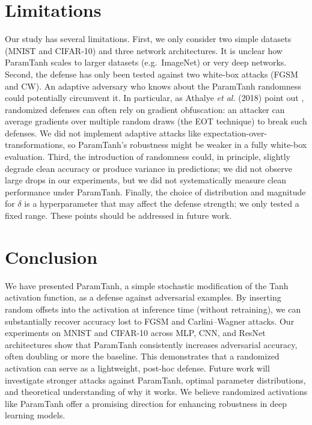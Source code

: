 \documentclass{llncs}
\begin{document}
{\section{Limitations}
Our study has several limitations. First, we only consider two simple datasets (MNIST and CIFAR-10) and three network architectures. It is unclear how ParamTanh scales to larger datasets (e.g.\ ImageNet) or very deep networks. Second, the defense has only been tested against two white-box attacks (FGSM and CW). An adaptive adversary who knows about the ParamTanh randomness could potentially circumvent it. In particular, as Athalye \emph{et al.} (2018) point out \cite{Athalye2018}, randomized defenses can often rely on gradient obfuscation: an attacker can average gradients over multiple random draws (the EOT technique) to break such defenses. We did not implement adaptive attacks like expectation-over-transformations, so ParamTanh’s robustness might be weaker in a fully white-box evaluation. Third, the introduction of randomness could, in principle, slightly degrade clean accuracy or produce variance in predictions; we did not observe large drops in our experiments, but we did not systematically measure clean performance under ParamTanh. Finally, the choice of distribution and magnitude for $\delta$ is a hyperparameter that may affect the defense strength; we only tested a fixed range. These points should be addressed in future work. 

\section{Conclusion}
We have presented ParamTanh, a simple stochastic modification of the Tanh activation function, as a defense against adversarial examples. By inserting random offsets into the activation at inference time (without retraining), we can substantially recover accuracy lost to FGSM and Carlini–Wagner attacks. Our experiments on MNIST and CIFAR-10 across MLP, CNN, and ResNet architectures show that ParamTanh consistently increases adversarial accuracy, often doubling or more the baseline. This demonstrates that a randomized activation can serve as a lightweight, post-hoc defense. Future work will investigate stronger attacks against ParamTanh, optimal parameter distributions, and theoretical understanding of why it works. We believe randomized activations like ParamTanh offer a promising direction for enhancing robustness in deep learning models. 

}
\end{document}
